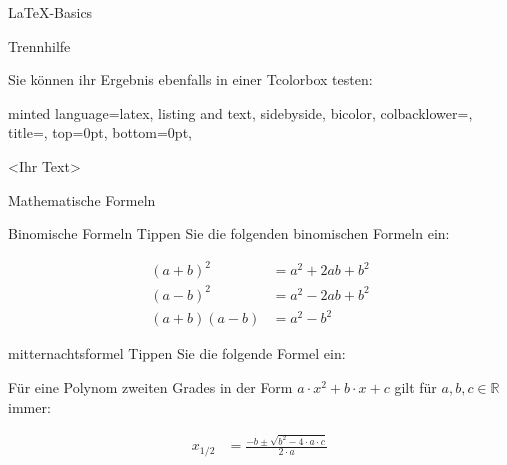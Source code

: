 \documentclass[
    inlineshortcut=java, %
    corporatedesign, %
    boxarc, %
]{algoexercise}
\begin{document}
\begin{task}[points=auto]{\LaTeX-Basics}
\begin{subtask*}[points=1]{Trennhilfe}
\begin{figure}[ht!]
                \label{fig:example-hyphenation}
            \end{figure}
            \FloatBarrier
            Sie können ihr Ergebnis ebenfalls in einer Tcolorbox testen:
            \begin{codeBlock}[
                escapeinside=||,
                ]{
                minted language=latex,
                listing and text,
                sidebyside,
                bicolor,
                colbacklower=,
                title=,
                top=0pt,
                bottom=0pt,
                }
                \begin{tcolorbox}[width=3cm]
                    <Ihr Text>
                \end{tcolorbox}
            \end{codeBlock}
        \end{subtask*}
    \end{task}
    \begin{task}[points=auto]{Mathematische Formeln}
        \begin{subtask*}[points=3]{Binomische Formeln}
            Tippen Sie die folgenden binomischen Formeln ein:
            \begin{grayInfoBox}
                \begin{align}
                    (a+b)^2    & = a^2 + 2ab + b^2 \\
                    (a-b)^2    & = a^2 - 2ab + b^2 \\
                    (a+b)(a-b) & = a^2 - b^2
                \end{align}
            \end{grayInfoBox}
        \end{subtask*}
        \begin{subtask*}[points=1]{mitternachtsformel}
            Tippen Sie die folgende Formel ein:
            \begin{grayInfoBox}
                Für eine Polynom zweiten Grades in der Form $a\cdot x^2+b\cdot x + c$ gilt für $a,b,c \in \mathbb{R}$ immer:%

                \begin{align}
                    x_{1/2} & =\frac{-b\pm\sqrt{b^{2}-4\cdot a \cdot c}}{2\cdot a}
                \end{align}

            \end{grayInfoBox}
        \end{subtask*}
    \end{task}
\end{document}
